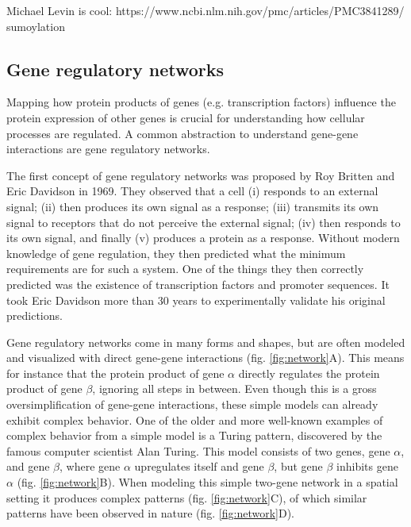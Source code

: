 Michael Levin is cool: https://www.ncbi.nlm.nih.gov/pmc/articles/PMC3841289/
sumoylation

\subsection{Gene regulatory networks}

Mapping how protein products of genes (e.g. transcription factors) influence the protein expression of other genes is crucial for understanding how cellular processes are regulated. A common abstraction to understand gene-gene interactions are gene regulatory networks.

The first concept of gene regulatory networks was proposed by Roy Britten and Eric Davidson in 1969\cite{Britten_1969}. They observed that a cell (i) responds to an external signal; (ii) then produces its own signal as a response; (iii) transmits its own signal to receptors that do not perceive the external signal; (iv) then responds to its own signal, and finally (v) produces a protein as a response. Without modern knowledge of gene regulation, they then predicted what the minimum requirements are for such a system. One of the things they then correctly predicted was the existence of transcription factors and promoter sequences. It took Eric Davidson more than 30 years to experimentally validate his original predictions\cite{Davidson_2002}.

Gene regulatory networks come in many forms and shapes, but are often modeled and visualized with direct gene-gene interactions (fig. \ref{fig:network}A). This means for instance that the protein product of gene $\alpha$ directly regulates the protein product of gene $\beta$, ignoring all steps in between. Even though this is a gross oversimplification of gene-gene interactions, these simple models can already exhibit complex behavior. One of the older and more well-known examples of complex behavior from a simple model is a Turing pattern, discovered by the famous computer scientist Alan Turing\cite{Turing1952}. This model consists of two genes, gene $\alpha$, and gene $\beta$, where gene $\alpha$ upregulates itself and gene $\beta$, but gene $\beta$ inhibits gene $\alpha$ (fig. \ref{fig:network}B). When modeling this simple two-gene network in a spatial setting it produces complex patterns (fig. \ref{fig:network}C), of which similar patterns have been observed in nature (fig. \ref{fig:network}D).

